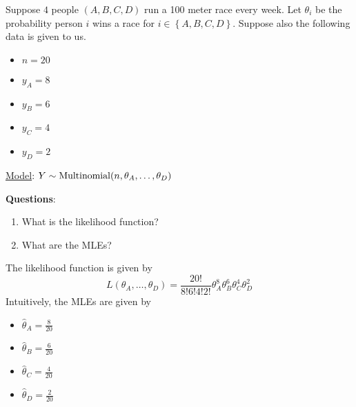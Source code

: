 \begin{exbox}
    \begin{example}
        Suppose $ 4 $ people $ (A,B,C,D) $ run a 100 meter race every week.
        Let $ \theta_i $ be the probability person $ i $ wins a race for
        $ i\in\left\{ A,B,C,D\right\} $.
        Suppose also the following data is given to us.
        \begin{itemize}
            \item $ n=20 $
            \item $ y_A=8 $
            \item $ y_B=6 $
            \item $ y_C=4 $
            \item $ y_D=2 $
        \end{itemize}
        \underline{Model}: $ Y \sim \operatorname{Multinomial}(n,\theta_A,\ldots ,\theta_D) $

        \textbf{Questions}:
        \begin{enumerate}[label=(\alph*)]
            \item What is the likelihood function?
            \item What are the MLEs?
        \end{enumerate}
        The likelihood function is given by
        \[ L(\theta_A,\ldots ,\theta_D)=\frac{20!}{8!6!4!2!} \theta_A^8\theta_B^6\theta_C^4\theta_D^2 \]
        Intuitively, the MLEs are given by
        \begin{itemize}
            \item $ \hat{\theta}_A=\frac{8}{20} $
            \item $ \hat{\theta}_B=\frac{6}{20} $
            \item $ \hat{\theta}_C=\frac{4}{20} $
            \item $ \hat{\theta}_D=\frac{2}{20} $
        \end{itemize}
    \end{example}
\end{exbox}

